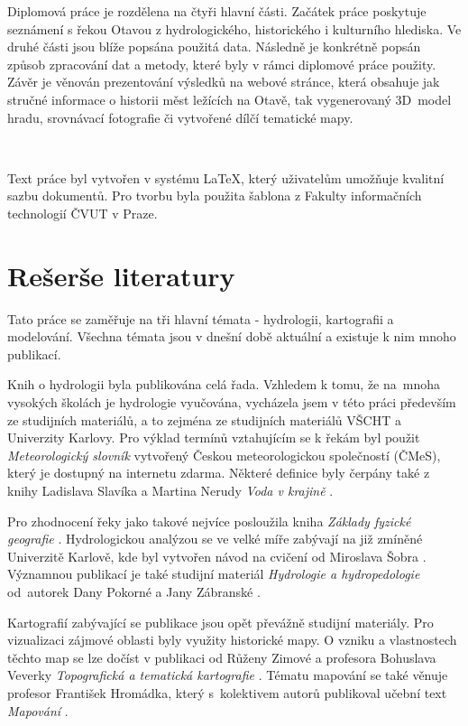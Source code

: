 \documentclass[thesis=M,czech]{FITthesis}[2012/06/26]
\begin{document}
\begin{introduction}
Diplomová práce je rozdělena na čtyři hlavní části. Začátek práce poskytuje seznámení s řekou Otavou z hydrologického, historického i kulturního hlediska. Ve druhé části jsou blíže popsána použitá data. Následně je konkrétně popsán způsob zpracování dat a metody, které byly v rámci diplomové práce použity. Závěr je věnován prezentování výsledků na webové stránce, která obsahuje jak stručné informace o historii měst ležících na Otavě, tak vygenerovaný 3D~model hradu, srovnávací fotografie či vytvořené dílčí tematické mapy.

\

Text práce byl vytvořen v systému \LaTeX, který uživatelům umožňuje kvalitní sazbu dokumentů. Pro tvorbu byla použita šablona z Fakulty informačních technologií ČVUT v Praze.


\end{introduction}

\chapter{Rešerše literatury}
Tato práce se zaměřuje na tři hlavní témata - hydrologii, kartografii a modelování. Všechna témata jsou v dnešní době aktuální a existuje k nim mnoho publikací.


Knih o hydrologii byla publikována celá řada. Vzhledem k tomu, že na~mnoha vysokých školách je hydrologie vyučována, vycházela jsem v této práci především ze studijních materiálů, a to zejména ze studijních materiálů VŠCHT a Univerzity Karlovy. Pro výklad termínů vztahujícím se k řekám byl použit \textit{Meteorologický slovník} \cite{meteo} vytvořený Českou meteorologickou společností (ČMeS), který je dostupný na internetu zdarma. Některé definice byly čerpány také z knihy Ladislava Slavíka a Martina Nerudy \textit{Voda v krajině} \cite{definiceHydro}. 


Pro zhodnocení řeky jako takové nejvíce posloužila kniha \textit{Základy fyzické geografie} \cite{FGkniha}. Hydrologickou analýzou se ve velké míře zabývají na již zmíněné Univerzitě Karlově, kde byl vytvořen návod na cvičení od Miroslava Šobra \cite{UK}. Významnou publikací je také studijní materiál \textit{Hydrologie a hydropedologie} od~autorek Dany Pokorné a Jany Zábranské \cite{hydrovscht}. 

Kartografií zabývající se publikace jsou opět převážně studijní materiály. Pro vizualizaci zájmové oblasti byly využity historické mapy. O vzniku a vlastnostech těchto map se lze dočíst v publikaci od Růženy Zimové a profesora Bohuslava Veverky \textit{Topografická a tematická kartografie} \cite{topo_skripta}. Tématu mapování se také věnuje profesor František Hromádka, který s~kolektivem autorů publikoval učební text \textit{Mapování} \cite{mapovani_brno}.
\end{document}
